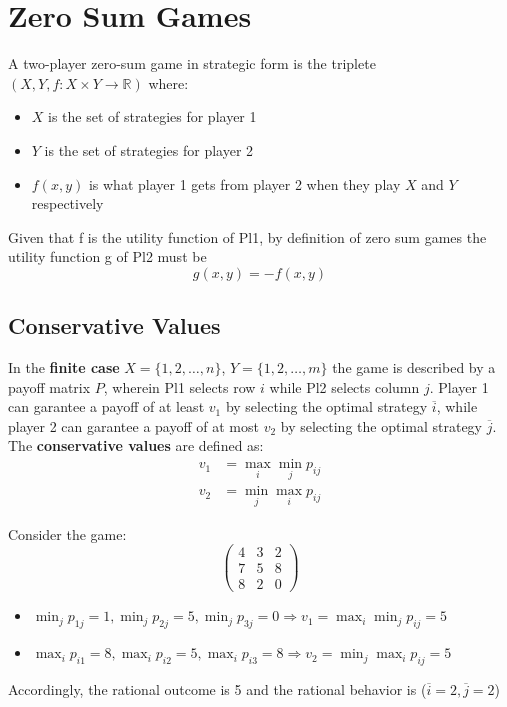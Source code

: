 \documentclass[../main.tex]{subfiles}
\begin{document}
\chapter{Zero Sum Games}
\begin{definition}
    A two-player zero-sum game in strategic form is the triplete $(X,Y, f: X \times Y \to \mathbb{R})$ where:
    \begin{itemize}[noitemsep]
        \item $X$ is the set of strategies for player 1
        \item $Y$ is the set of strategies for player 2
        \item $f(x, y)$ is what player 1 gets from player 2 when they play $X$ and $Y$ respectively
    \end{itemize}
    Given that f is the utility function of Pl1, by definition of zero sum games the utility function g of Pl2 must be
    \[
        g(x, y) = -f(x, y)
    \]
\end{definition}

\section{Conservative Values}
In the \textbf{finite case} $X = \{1,2,\ldots,n\}$, $Y = \{1,2,\ldots,m\}$ the game is described by a payoff matrix $P$, wherein Pl1 selects row $i$ while Pl2 selects column $j$. Player 1 can garantee a payoff of at least $v_1$ by selecting the optimal strategy $\overline{i}$, while player 2 can garantee a payoff of at most $v_2$ by selecting the optimal strategy $\overline{j}$. The \textbf{conservative values} are defined as:
\begin{align*}
    v_1 & = \max_{i} \min_{j} p_{ij} \\
    v_2 & = \min_{j} \max_{i} p_{ij}
\end{align*}

\begin{example}
    Consider the game:
    \[
        \begin{pmatrix}
            4 & 3 & 2 \\
            7 & 5 & 8 \\
            8 & 2 & 0
        \end{pmatrix}
    \]
    \begin{itemize}
        \item $\min_j p_{1j} = 1, \min_j p_{2j} = 5, \min_j p_{3j} = 0 \Rightarrow v_1 = \max_i \min_j p_{ij} = 5$
        \item $\max_i p_{i1} = 8, \max_i p_{i2} = 5, \max_i p_{i3} = 8 \Rightarrow v_2 = \min_j \max_i p_{ij} = 5$
    \end{itemize}

    Accordingly, the rational outcome is 5 and the rational behavior is ($\overline{i} = 2, \overline{j} = 2$)
\end{example}
\end{document}
